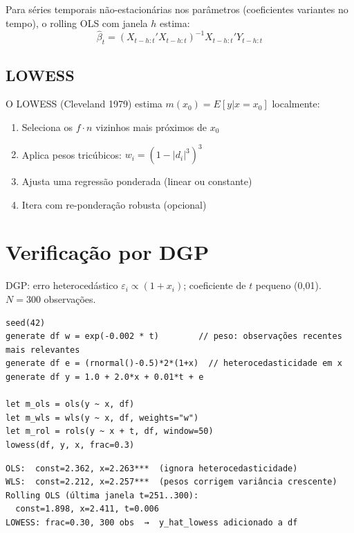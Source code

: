 Para séries temporais não-estacionárias nos parâmetros (coeficientes variantes
no tempo), o rolling OLS com janela $h$ estima:
\[
  \hat{\beta}_t = (X_{t-h:t}' X_{t-h:t})^{-1} X_{t-h:t}' Y_{t-h:t}
\]

\subsection*{LOWESS}

O LOWESS (Cleveland 1979) estima $m(x_0) = E[y | x = x_0]$ localmente:
\begin{enumerate}
  \item Seleciona os $f \cdot n$ vizinhos mais próximos de $x_0$
  \item Aplica pesos tricúbicos: $w_i = (1 - |d_i|^3)^3$
  \item Ajusta uma regressão ponderada (linear ou constante)
  \item Itera com re-ponderação robusta (opcional)
\end{enumerate}

\section{Verificação por DGP}

DGP: erro heterocedástico $\varepsilon_i \propto (1 + x_i)$; coeficiente de
$t$ pequeno (0{,}01). $N = 300$ observações.

\begin{lstlisting}[caption={WLS, Rolling OLS, LOWESS}]
seed(42)
generate df w = exp(-0.002 * t)        // peso: observações recentes mais relevantes
generate df e = (rnormal()-0.5)*2*(1+x)  // heterocedasticidade em x
generate df y = 1.0 + 2.0*x + 0.01*t + e

let m_ols = ols(y ~ x, df)
let m_wls = wls(y ~ x, df, weights="w")
let m_rol = rols(y ~ x + t, df, window=50)
lowess(df, y, x, frac=0.3)
\end{lstlisting}

\begin{lstlisting}[language={}, basicstyle=\ttfamily\small, frame=none,
  numbers=none, backgroundcolor=\color{codbg}]
OLS:  const=2.362, x=2.263***  (ignora heterocedasticidade)
WLS:  const=2.212, x=2.257***  (pesos corrigem variância crescente)
Rolling OLS (última janela t=251..300):
  const=1.898, x=2.411, t=0.006
LOWESS: frac=0.30, 300 obs  →  y_hat_lowess adicionado a df
\end{lstlisting}

